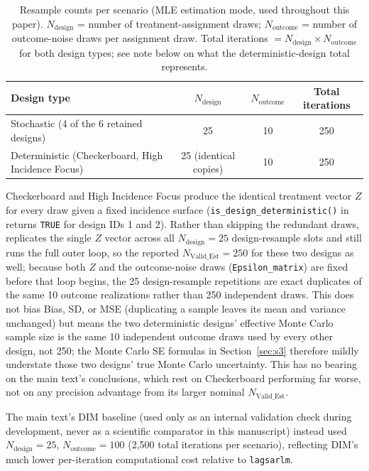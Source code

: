 \documentclass[11pt]{article}
\begin{document}
\begin{table}[h]
\centering
\caption{Resample counts per scenario (MLE estimation mode, used throughout this
paper). $N_{\text{design}}$ = number of treatment-assignment draws;
$N_{\text{outcome}}$ = number of outcome-noise draws per assignment draw. Total
iterations $= N_{\text{design}} \times N_{\text{outcome}}$ for both design
types; see note below on what the deterministic-design total represents.}
\begin{tabular}{p{6.0cm}ccc}
\toprule
Design type & $N_{\text{design}}$ & $N_{\text{outcome}}$ & Total iterations \\
\midrule
Stochastic (4 of the 6 retained designs) & 25 & 10 & 250 \\
Deterministic (Checkerboard, High Incidence Focus) & 25 (identical copies) & 10 & 250 \\
\bottomrule
\end{tabular}
\end{table}

Checkerboard and High Incidence Focus produce the identical treatment vector
$Z$ for every draw given a fixed incidence surface (\texttt{is\_design\_deterministic()}
in  returns \texttt{TRUE} for design IDs 1 and 2). Rather
than skipping the redundant draws,  replicates the
single $Z$ vector across all $N_{\text{design}}=25$ design-resample slots and
still runs the full outer loop, so the reported $N_{\text{Valid\_Est}}=250$ for
these two designs as well; because both $Z$ and the outcome-noise draws
(\texttt{Epsilon\_matrix}) are fixed before that loop begins, the 25
design-resample repetitions are exact duplicates of the same 10 outcome
realizations rather than 250 independent draws. This does not bias Bias, SD,
or MSE (duplicating a sample leaves its mean and variance unchanged) but means
the two deterministic designs' effective Monte Carlo sample size is the same
10 independent outcome draws used by every other design, not 250; the Monte
Carlo SE formulas in Section~\ref{sec:s3} therefore mildly understate those two
designs' true Monte Carlo uncertainty. This has no bearing on the main text's
conclusions, which rest on Checkerboard performing far worse, not on any
precision advantage from its larger nominal $N_{\text{Valid\_Est}}$.

The main text's DIM baseline (used only as an internal validation check during
development, never as a scientific comparator in this manuscript) instead used
$N_{\text{design}}=25$, $N_{\text{outcome}}=100$ (2{,}500 total iterations per
scenario), reflecting DIM's much lower per-iteration computational cost relative
to \texttt{lagsarlm}.
\end{document}
